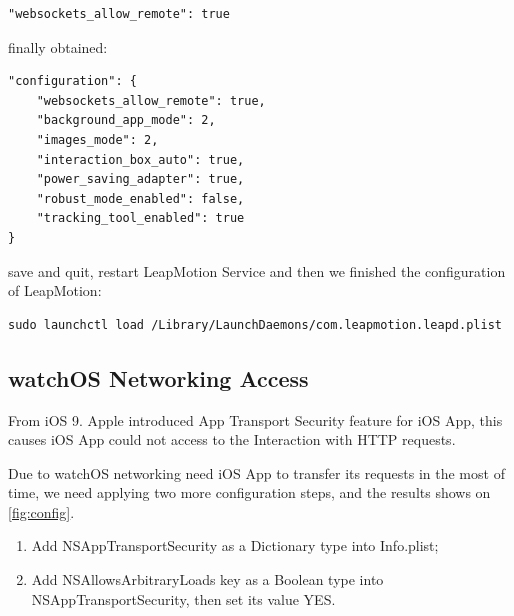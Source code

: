 \begin{lstlisting}[frame=trBL,frameround=fttt,rulesepcolor=\color{white},numbers=none]
"websockets_allow_remote": true
\end{lstlisting}

finally obtained:

\begin{lstlisting}[frame=trBL,frameround=fttt,rulesepcolor=\color{white},numbers=none]
"configuration": {
    "websockets_allow_remote": true,
    "background_app_mode": 2,
    "images_mode": 2,
    "interaction_box_auto": true,
    "power_saving_adapter": true,
    "robust_mode_enabled": false,
    "tracking_tool_enabled": true
}
\end{lstlisting}

save and quit, restart LeapMotion Service and then we finished the configuration of LeapMotion:

\begin{lstlisting}[frame=trBL,frameround=fttt,rulesepcolor=\color{white},numbers=none]
sudo launchctl load /Library/LaunchDaemons/com.leapmotion.leapd.plist
\end{lstlisting}

\subsection{watchOS Networking Access}

From iOS 9. Apple introduced App Transport Security feature for iOS App, this causes iOS App could not access to the Interaction with HTTP requests.

Due to watchOS networking need iOS App to transfer its requests in the most of time, we need applying two more configuration steps, and the results shows on \ref{fig:config}.

\begin{enumerate}
    \item Add NSAppTransportSecurity as a Dictionary type into Info.plist;
    \item Add NSAllowsArbitraryLoads key as a Boolean type into NSAppTransportSecurity, then set its value YES.
\end{enumerate}


